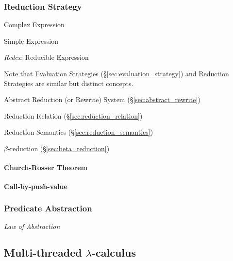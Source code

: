 \subsubsection{Reduction Strategy}\label{sec:reduction_strategy}

Complex Expression

Simple Expression

\emph{Redex}: Reducible Expression

\fist Note that Evaluation Strategies
(\S\ref{sec:evaluation_strategy}) and Reduction Strategies are similar
but distinct concepts.

Abstract Reduction (or Rewrite) System (\S\ref{sec:abstract_rewrite})

Reduction Relation (\S\ref{sec:reduction_relation})

Reduction Semantics (\S\ref{sec:reduction_semantics})

$\beta$-reduction (\S\ref{sec:beta_reduction})



\paragraph{Church-Rosser Theorem}\label{sec:church_rosser}\hfill

\paragraph{Call-by-push-value}\label{sec:call_by_pushvalue}\hfill



\subsubsection{Predicate Abstraction}\label{sec:predicate_abstraction}

\emph{Law of Abstraction}



\subsection{Multi-threaded $\lambda$-calculus}\label{sec:mtlc}

\begingroup

\newcommand{\Chpos}{\mathsf{Chpos}}
\newcommand{\Chneg}{\mathsf{Chneg}}
\newcommand{\channelsend}{\mono{channel\_send}}
\newcommand{\chanpossend}{\mono{chanpos\_send}}
\newcommand{\channegsend}{\mono{channeg\_send}}
\newcommand{\channelrecv}{\mono{channel\_recv}}
\newcommand{\chanposrecv}{\mono{chanpos\_recv}}
\newcommand{\channegrecv}{\mono{channeg\_recv}}
\newcommand{\channelclose}{\mono{channel\_close}}
\newcommand{\chanposclose}{\mono{chanpos\_close}}
\newcommand{\channegclose}{\mono{channeg\_close}}
\renewcommand{\snd}{\mono{snd}}
\newcommand{\rcv}{\mono{rcv}}
\renewcommand{\Unit}{\mathsf{()}}

